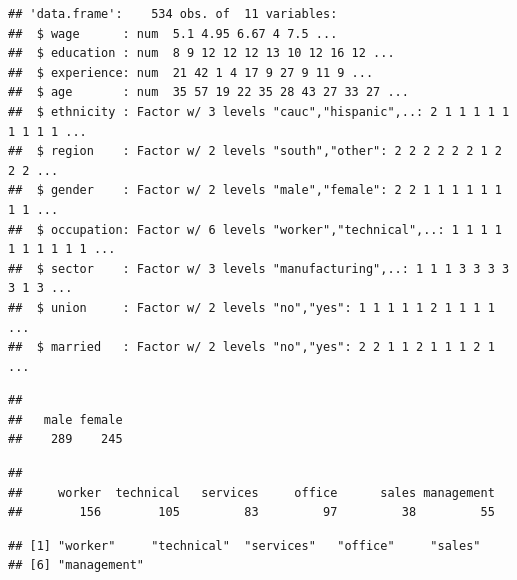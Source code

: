 \documentclass[]{book}
\newenvironment{Shaded}{\begin{snugshade}}{\end{snugshade}}
\newcommand{\CommentTok}[1]{\textcolor[rgb]{0.56,0.35,0.01}{\textit{#1}}}
\newcommand{\KeywordTok}[1]{\textcolor[rgb]{0.13,0.29,0.53}{\textbf{#1}}}
\newcommand{\NormalTok}[1]{#1}
\newcommand{\OperatorTok}[1]{\textcolor[rgb]{0.81,0.36,0.00}{\textbf{#1}}}
\begin{document}
\begin{verbatim}
## 'data.frame':    534 obs. of  11 variables:
##  $ wage      : num  5.1 4.95 6.67 4 7.5 ...
##  $ education : num  8 9 12 12 12 13 10 12 16 12 ...
##  $ experience: num  21 42 1 4 17 9 27 9 11 9 ...
##  $ age       : num  35 57 19 22 35 28 43 27 33 27 ...
##  $ ethnicity : Factor w/ 3 levels "cauc","hispanic",..: 2 1 1 1 1 1 1 1 1 1 ...
##  $ region    : Factor w/ 2 levels "south","other": 2 2 2 2 2 2 1 2 2 2 ...
##  $ gender    : Factor w/ 2 levels "male","female": 2 2 1 1 1 1 1 1 1 1 ...
##  $ occupation: Factor w/ 6 levels "worker","technical",..: 1 1 1 1 1 1 1 1 1 1 ...
##  $ sector    : Factor w/ 3 levels "manufacturing",..: 1 1 1 3 3 3 3 3 1 3 ...
##  $ union     : Factor w/ 2 levels "no","yes": 1 1 1 1 1 2 1 1 1 1 ...
##  $ married   : Factor w/ 2 levels "no","yes": 2 2 1 1 2 1 1 1 2 1 ...
\end{verbatim}

\begin{Shaded}
\end{Shaded}

\begin{verbatim}
## 
##   male female 
##    289    245
\end{verbatim}

\begin{Shaded}
\end{Shaded}

\begin{verbatim}
## 
##     worker  technical   services     office      sales management 
##        156        105         83         97         38         55
\end{verbatim}

\begin{Shaded}
\end{Shaded}

\begin{verbatim}
## [1] "worker"     "technical"  "services"   "office"     "sales"     
## [6] "management"
\end{verbatim}
\end{document}
